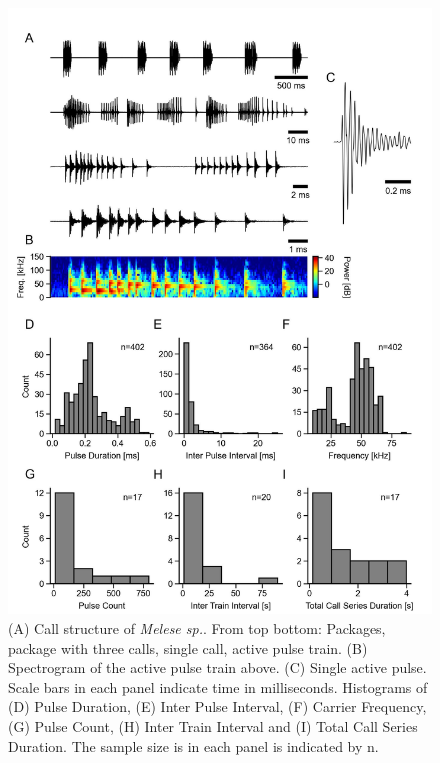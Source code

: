 \documentclass[12pt,a4paper,pdftex]{article}
\newcommand{\species}[1]{\textit{#1}}
\begin{document}
\FloatBarrier
\begin{figure}[h!]
	\centering
	\includegraphics{figures/Fig_01.jpeg}
	\caption{\label{fig:01}(A) Call structure of \species{Melese sp.}. From top bottom: Packages, package with three calls, single call, active pulse train. (B) Spectrogram of the active pulse train above. (C) Single active pulse. Scale bars in each panel indicate time in milliseconds.
    Histograms of (D) Pulse Duration, (E) Inter Pulse Interval, (F) Carrier Frequency, (G) Pulse Count, (H) Inter Train Interval and (I) Total Call Series Duration. The sample size is in each panel is indicated by n.}
\end{figure}
\end{document}

